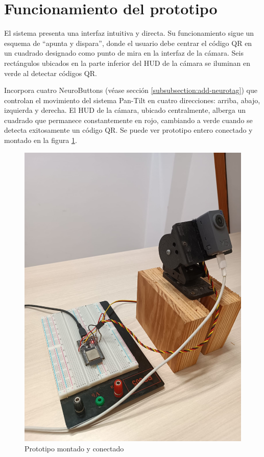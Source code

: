 \section{Funcionamiento del prototipo}
\label{section:prototype-working}
El sistema presenta una interfaz intuitiva y directa. Su funcionamiento sigue un esquema de ``apunta y dispara'', donde el usuario debe centrar el código QR en un cuadrado designado como punto de mira en la interfaz de la cámara. Seis rectángulos ubicados en la parte inferior del HUD de la cámara se iluminan en verde al detectar códigos QR.



Incorpora cuatro NeuroButtons (véase sección \ref{subsubsection:add-neurotag}) que controlan el movimiento del sistema Pan-Tilt en cuatro direcciones: arriba, abajo, izquierda y derecha. El HUD de la cámara, ubicado centralmente, alberga un cuadrado que permanece constantemente en rojo, cambiando a verde cuando se detecta exitosamente un código QR. Se puede ver prototipo entero conectado y montado en la figura \ref{figure:prototipo-working}.

\begin{figure}[!htb]
   \centering
    \includegraphics[width=0.35\linewidth]{figures/prototipo.jpg}
   \caption{Prototipo montado y conectado}
   \label{figure:prototipo-working}
\end{figure}